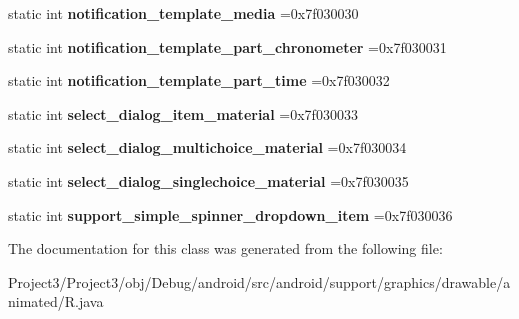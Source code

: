 \begin{DoxyCompactItemize}
\item 
\mbox{\label{classandroid_1_1support_1_1graphics_1_1drawable_1_1animated_1_1R_1_1layout_ab93d4ac0edc61f439d060792ae8746f2}} 
static int {\bfseries notification\+\_\+template\+\_\+media} =0x7f030030
\item 
\mbox{\label{classandroid_1_1support_1_1graphics_1_1drawable_1_1animated_1_1R_1_1layout_afda5ee18d6e2d095794b37bc15d042d7}} 
static int {\bfseries notification\+\_\+template\+\_\+part\+\_\+chronometer} =0x7f030031
\item 
\mbox{\label{classandroid_1_1support_1_1graphics_1_1drawable_1_1animated_1_1R_1_1layout_a89a3fc557a6c23cd384afa07e20452bd}} 
static int {\bfseries notification\+\_\+template\+\_\+part\+\_\+time} =0x7f030032
\item 
\mbox{\label{classandroid_1_1support_1_1graphics_1_1drawable_1_1animated_1_1R_1_1layout_a5c9cf33b354180c50d39c1d4bf953a38}} 
static int {\bfseries select\+\_\+dialog\+\_\+item\+\_\+material} =0x7f030033
\item 
\mbox{\label{classandroid_1_1support_1_1graphics_1_1drawable_1_1animated_1_1R_1_1layout_a194585ab23f351bf184fc604f3aa2130}} 
static int {\bfseries select\+\_\+dialog\+\_\+multichoice\+\_\+material} =0x7f030034
\item 
\mbox{\label{classandroid_1_1support_1_1graphics_1_1drawable_1_1animated_1_1R_1_1layout_a521a5ae3e6234e7e8d1bfdb3bf2577dd}} 
static int {\bfseries select\+\_\+dialog\+\_\+singlechoice\+\_\+material} =0x7f030035
\item 
\mbox{\label{classandroid_1_1support_1_1graphics_1_1drawable_1_1animated_1_1R_1_1layout_ac5cd9316b39891b46c9d59f086287b52}} 
static int {\bfseries support\+\_\+simple\+\_\+spinner\+\_\+dropdown\+\_\+item} =0x7f030036
\end{DoxyCompactItemize}


The documentation for this class was generated from the following file\+:\begin{DoxyCompactItemize}
\item 
Project3/\+Project3/obj/\+Debug/android/src/android/support/graphics/drawable/animated/R.\+java\end{DoxyCompactItemize}
